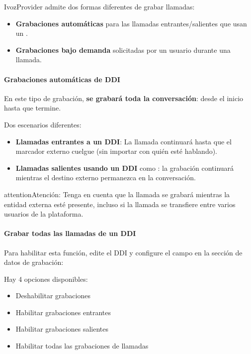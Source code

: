 \documentclass[letterpaper,10pt,spanish]{sphinxmanual}
\begin{document}
IvozProvider admite dos formas diferentes de grabar llamadas:
\begin{itemize}
\item {} 
\textbf{Grabaciones automáticas} para las llamadas entrantes/salientes que usan un {\hyperref[administration_portal/brand/views/ddis:ddis]{}}.

\item {} 
\textbf{Grabaciones bajo demanda} solicitadas por un usuario durante una llamada.

\end{itemize}


\paragraph{Grabaciones automáticas de DDI}
\label{administration_portal/client/retail/calls/call_recordings:automatic-ddi-recordings}
En este tipo de grabación, \textbf{se grabará toda la conversación}: desde el inicio hasta que termine.

Dos escenarios diferentes:
\begin{itemize}
\item {} 
\textbf{Llamadas entrantes a un DDI}: La llamada continuará hasta que el marcador externo cuelgue (sin importar con quién esté hablando).

\item {} 
\textbf{Llamadas salientes usando un DDI} como {\hyperref[administration_portal/brand/views/ddis:ddis]{}}: la grabación continuará mientras el destino externo permanezca en la conversación.

\end{itemize}

\begin{notice}{attention}{Atención:}
Tenga en cuenta que la llamada se grabará mientras la entidad externa esté presente, incluso si la llamada se transfiere entre varios usuarios de la plataforma.
\end{notice}
\paragraph{Grabar todas las llamadas de un DDI}

Para habilitar esta función, edite el DDI y configure el campo en la sección de datos de grabación:

Hay 4 opciones disponibles:
\begin{itemize}
\item {} 
Deshabilitar grabaciones

\item {} 
Habilitar grabaciones entrantes

\item {} 
Habilitar grabaciones salientes

\item {} 
Habilitar todas las grabaciones de llamadas

\end{itemize}
\end{document}
